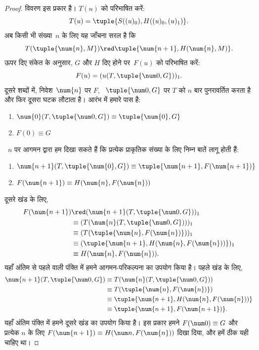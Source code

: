 \documentclass[../../../include/open-logic-section]{subfiles}
\begin{document}
\begin{proof}
विवरण इस प्रकार है। $T(u)$ को परिभाषित करें:
\[
T(u) = \tuple{S((u)_0), H((u)_0,(u)_1)}.
\]
अब किसी भी संख्या~$n$ के लिए यह जाँचना सरल है कि
\[
T(\tuple{\num{n}, M}) \red \tuple{\num{n+1}, H(\num{n}, M)}.
\]
ऊपर दिए संकेत के अनुसार, $G$ और $H$ दिए होने पर~$F(u)$ को परिभाषित करें:
\[
F(u) = (u(T,\tuple{\num 0, G}))_1.
\]
दूसरे शब्दों में, निवेश~$\num{n}$ पर $F$, ~$\tuple{\num 0, G}$ पर $T$ को
$n$ बार पुनरावर्तित करता है और फिर दूसरा घटक लौटाता है। आरंभ में हमारे पास
है:
\begin{enumerate}
\item $\num{0} (T, \tuple{\num 0, G}) \equiv \tuple{\num{0}, G}$
\item $F(\num{0}) \equiv G$
\end{enumerate}
~$n$ पर आगमन द्वारा हम दिखा सकते हैं कि प्रत्येक प्राकृतिक संख्या के लिए
निम्न बातें लागू होती हैं:
\begin{enumerate}
\item $\num{n+1}(T, \tuple{\num{0}, G}) \equiv \tuple{\num{n+1}, F(\num{n+1})}$
\item $F(\num{n+1}) \equiv H(\num{n}, F(\num{n}))$
\end{enumerate}
दूसरे खंड के लिए,
\begin{align*}
F(\num{n+1}) & \red (\num{n+1}(T, \tuple{\num 0, G}))_1 \\
& \equiv (T(\num{n} (T, \tuple{\num 0, G})))_1 \\
& \equiv (T(\tuple{\num{n}, F(\num{n})}))_1 \\
& \equiv (\tuple{\num{n+1}, H(\num{n}, F(\num{n}))})_1 \\
& \equiv H(\num{n}, F(\num{n})).
\end{align*}
यहाँ अंतिम से पहले वाली पंक्ति में हमने आगमन-परिकल्पना का उपयोग किया है।
पहले खंड के लिए,
\begin{align*}
\num{n+1} (T, \tuple{\num 0, G}) &
\equiv T(\num{n} (T, \tuple{\num 0, G})) \\
& \equiv T( \tuple{\num{n}, F(\num{n})}) \\
& \equiv \tuple{\num{n+1}, H(\num{n}, F(\num{n}))} \\
& \equiv \tuple{\num{n+1}, F(\num{n+1})}.
\end{align*}
यहाँ अंतिम पंक्ति में हमने दूसरे खंड का उपयोग किया है। इस प्रकार हमने
$F(\num 0) \equiv G$ और प्रत्येक $n$ के लिए $F(\num {n+1}) \equiv H(\num
n, F(\num{n}))$ दिखा दिया, और हमें ठीक यही चाहिए था।
\end{proof}
\end{document}
